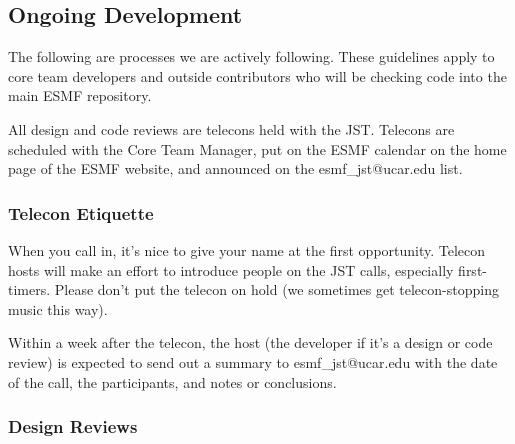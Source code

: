 \subsection{Ongoing Development}

The following are processes we are actively following.  These
guidelines apply to core team developers and outside contributors
who will be checking code into the main ESMF repository.

All design and code reviews are telecons held with the JST. 
Telecons are scheduled with the Core Team Manager, put on the ESMF
calendar on the home page of the ESMF website, and announced on the
esmf\_jst@ucar.edu list.

\subsubsection{Telecon Etiquette}

When you call in, it's nice to give your name at the first opportunity.
Telecon hosts will make an effort to introduce people on the JST calls,
especially first-timers. Please don't put the telecon on hold (we sometimes
get telecon-stopping music this way).

Within a week after the telecon, the host (the developer if it's a design
or code review) is expected to send out a summary to esmf\_jst@ucar.edu
with the date of the call, the participants, and notes or conclusions.

\subsubsection{Design Reviews}

